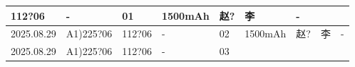 \documentclass[UTF8,10pt,a4paper,fontset=fandol]{ctexart}
\newcommand{\fieldvalue}[1]{#1}
\newcommand{\handwritten}[1]{#1}
\begin{document}
\begin{tabular}{|p{1.55cm}|p{2.05cm}|p{1.35cm}|p{1.35cm}|p{1.55cm}|p{1.45cm}|p{1.25cm}|p{1.25cm}|p{1.20cm}|}
\fieldvalue{\handwritten{112?06}} &
\fieldvalue{\handwritten{-}} &
\fieldvalue{\handwritten{01}} &
\fieldvalue{\handwritten{1500mAh}} &
\fieldvalue{\handwritten{赵?}} &
\fieldvalue{\handwritten{李}} &
\fieldvalue{\handwritten{-}} \\
\hline
\fieldvalue{\handwritten{2025.08.29}} &
\fieldvalue{\handwritten{A1)225?06}} &
\fieldvalue{\handwritten{112?06}} &
\fieldvalue{\handwritten{-}} &
\fieldvalue{\handwritten{02}} &
\fieldvalue{\handwritten{1500mAh}} &
\fieldvalue{\handwritten{赵?}} &
\fieldvalue{\handwritten{李}} &
\fieldvalue{\handwritten{-}} \\
\hline
\fieldvalue{\handwritten{2025.08.29}} &
\fieldvalue{\handwritten{A1)225?06}} &
\fieldvalue{\handwritten{112?06}} &
\fieldvalue{\handwritten{-}} &
\fieldvalue{\handwritten{03}} &

\end{tabular}
\end{document}
